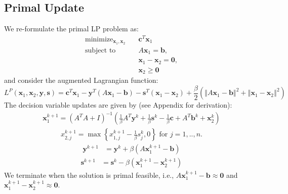 \documentclass{article}
\begin{document}
\subsection*{Primal Update}
We re-formulate the primal LP problem as:
\begin{align}
\text{minimize}_{ \mathbf{x}_{1}, \mathbf{x}_{2}} &\quad \mathbf{c}^T\mathbf{x}_1 \tag{LPR}\label{eq:LPR} \\
\text{subject to  \ \  } &\quad  A \mathbf{x}_{1} = \mathbf{b},  \nonumber \\
&\quad \mathbf{x}_{1}  - \mathbf{x}_{2} = \mathbf{0},  \nonumber \\
&\quad \mathbf{x}_{2} \geq \mathbf{0} \nonumber 
\end{align}
and consider the augmented Lagrangian function:
\[
L^{P}(\mathbf{x}_{1},\mathbf{x}_{2},\mathbf{y} ,\mathbf{s})=\mathbf{c}^{T}\mathbf{x}_{1}-\mathbf{y}^{T}\left(A\mathbf{x}_{1}-\mathbf{b}\right)-\mathbf{s}^{T}\left(\mathbf{x}_{1}-\mathbf{x}_{2}\right)+\frac{\beta}{2}\left(\left\Vert A\mathbf{x}_{1}-\mathbf{b}\right\Vert ^{2}+\left\Vert \mathbf{x}_{1}-\mathbf{x}_{2}\right\Vert ^{2}\right)
\]
The decision variable updates are given by (see Appendix for derivation):
\begin{align}\label{eq:x1_primal_update}
\mathbf{x}_{1}^{k+1} = \left(A^{T}A+I\right)^{-1}\left(\frac{1}{\beta}A^{T}\mathbf{y}^k+\frac{1}{\beta}\mathbf{s}^k-\frac{1}{\beta}\mathbf{c}+A^{T}\mathbf{b}^k+\mathbf{x}_{2}^k\right)
\end{align}
\begin{align}
{x}_{2,j}^{k+1} = \max\left\{ {x}_{1,j}^{k+1}-\frac{1}{\beta}{s}_j^k,0\right\} \text{ for $j = 1,..,n$}.
\end{align}
\begin{align}\label{eq:y_primal_update}
\mathbf{y}^{k+1} &= \mathbf{y}^{k} + \beta (A \mathbf{x}_1^{k+1}  - \mathbf{b}) 
\end{align}
\begin{align}\label{eq:s_primal_update}
\mathbf{s}^{k+1} &= \mathbf{s}^{k}  - \beta  (\mathbf{x}_1^{k+1}  -\mathbf{x}_2^{k+1} )
\end{align}
We terminate when the solution is primal feasible, i.e., $A \mathbf{x}_1^{k+1}  - \mathbf{b} \approx \mathbf{0}$ and $\mathbf{x}_1^{k+1}  -\mathbf{x}_2^{k+1} \approx \mathbf{0}$.

\end{document}
